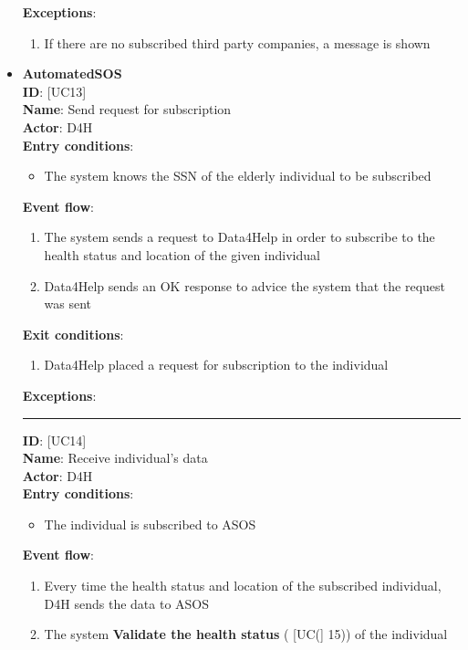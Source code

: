 \documentclass[a4paper, hidelinks, 12pt]{report}
\newcommand\usecase[1]{ [UC#1] }
\begin{document}
\begin{itemize}
		\textbf{Exceptions}:
  		\begin{enumerate}
			\item{If there are no subscribed third party companies, a message is shown}
		\end{enumerate}
		\item{\textbf{AutomatedSOS}}\\
		\textbf{ID}: \usecase{13} \\
		\textbf{Name}: Send request for subscription \\
		\textbf{Actor}: D4H \\
		\textbf{Entry conditions}:
		\begin{itemize}
			\item{The system knows the SSN of the elderly individual to be subscribed}
		\end{itemize}
		\textbf{Event flow}:
		\begin{enumerate}
			\item{The system sends a request to Data4Help in order to subscribe to the health status and location of the given individual}
			\item{Data4Help sends an OK response to advice the system that the request was sent}
		\end{enumerate}
		\textbf{Exit conditions}:
		\begin{enumerate}
			\item{Data4Help placed a request for subscription to the individual}
		\end{enumerate}
		\textbf{Exceptions}: \\
		\rule{\linewidth}{0.4pt}
		\textbf{ID}: \usecase{14} \\
		\textbf{Name}: Receive individual's data \\
		\textbf{Actor}: D4H \\
		\textbf{Entry conditions}:
		\begin{itemize}
			\item{The individual is subscribed to ASOS}
		\end{itemize}
		\textbf{Event flow}:
		\begin{enumerate}
			\item{Every time the health status and location of the subscribed individual, D4H sends the data to ASOS}
			\item{The system \textbf{Validate the health status} (\usecase(15)) of the individual}
		\end{enumerate}

\end{itemize}
\end{document}
